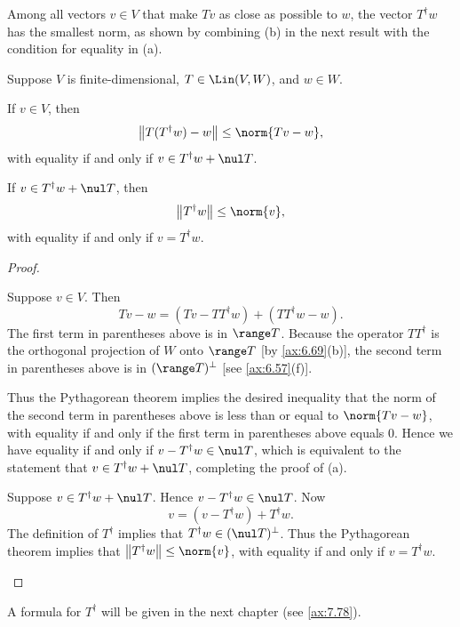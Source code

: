 Among all vectors $v\in V$ that make $Tv$ as close as possible to $w$, the
vector $T^\dagger w$ has the smallest norm, as shown by combining (b) in the
next result with the condition for equality in (a).

\begin{result}\label{ax:6.70}
Suppose $V$ is finite-dimensional, $T\in\Lin(V,W)$, and $w\in W$.
\begin{parts}
\item If $v\in V$, then
  \[ \bigl\lVert T(T^\dagger w)-w\bigr\rVert \le \norm{Tv-w}, \]
  with equality if and only if $v\in T^\dagger w+\nul T$.
\item If $v\in T^\dagger w+\nul T$, then
  \[ \bigl\lVert T^\dagger w\bigr\rVert \le \norm{v}, \]
  with equality if and only if $v=T^\dagger w$.
\end{parts}
\end{result}

\begin{proof}\leavevmode
\begin{parts}
\item Suppose $v\in V$. Then
  \[ Tv-w = (Tv-TT^\dagger w)+(TT^\dagger w-w). \]
  The first term in parentheses above is in $\range T$. Because the operator
  $TT^\dagger$ is the orthogonal projection of $W$ onto $\range T$ [by
  \ref{ax:6.69}(b)], the second term in parentheses above is in
  $(\range T)^\perp$ [see \ref{ax:6.57}(f)].

  Thus the Pythagorean theorem implies the desired inequality that the norm of
  the second term in parentheses above is less than or equal to
  $\norm{Tv-w}$, with equality if and only if the first term in parentheses
  above equals $0$. Hence we have equality if and only if
  $v-T^\dagger w\in\nul T$, which is equivalent to the statement that
  $v\in T^\dagger w+\nul T$, completing the proof of (a).
\item Suppose $v\in T^\dagger w+\nul T$. Hence $v-T^\dagger w\in\nul T$. Now
  \[ v = (v-T^\dagger w)+T^\dagger w. \]
  The definition of $T^\dagger$ implies that $T^\dagger w\in(\nul T)^\perp$.
  Thus the Pythagorean theorem implies that
  $\bigl\lVert T^\dagger w\bigr\rVert\le\norm{v}$, with equality if and only
  if $v=T^\dagger w$. \qedhere
\end{parts}
\end{proof}

A formula for $T^\dagger$ will be given in the next chapter (see
\ref{ax:7.78}).

